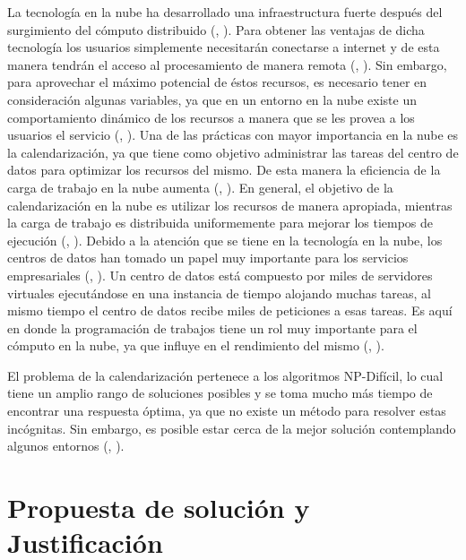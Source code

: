 La tecnolog\'ia en la nube ha desarrollado una infraestructura fuerte despu\'es del surgimiento del c\'omputo distribuido (\citeauthor{chen2009cloud}, \citeyear{chen2009cloud}). Para obtener las ventajas de dicha tecnolog\'ia los usuarios simplemente necesitar\'an conectarse a internet y de esta manera tendr\'an el acceso al procesamiento de manera remota (\citeauthor{aranganathan2011aco}, \citeyear{aranganathan2011aco}). Sin embargo, para aprovechar el m\'aximo potencial de \'estos recursos, es necesario tener en consideraci\'on algunas variables, ya que en un entorno en la nube existe un comportamiento din\'amico de los recursos a manera que se les provea a los usuarios el servicio (\citeauthor{shimpy2014different}, \citeyear{shimpy2014different}).
Una de las pr\'acticas con mayor importancia en la nube es la calendarizaci\'on, ya que tiene como objetivo administrar las tareas del centro de datos para optimizar los recursos del mismo. De esta manera la eficiencia de la carga de trabajo en la nube aumenta (\citeauthor{shimpy2014different}, \citeyear{shimpy2014different}).
En general, el objetivo de la calendarizaci\'on en la nube es utilizar los recursos de manera apropiada, mientras la carga de trabajo es distribuida uniformemente para mejorar los tiempos de ejecuci\'on (\citeauthor{shimpy2014different}, \citeyear{shimpy2014different}).
Debido a la atenci\'on que se tiene en la tecnolog\'ia en la nube, los centros de datos han tomado un papel muy importante para los servicios empresariales (\citeauthor{shimpy2014different}, \citeyear{shimpy2014different}). 
Un centro de datos est\'a compuesto por miles de servidores virtuales ejecut\'andose en una instancia de tiempo alojando muchas tareas, al mismo tiempo el centro de datos recibe miles de peticiones a esas tareas. Es aqu\'i en donde la programaci\'on de trabajos tiene un rol muy importante para el c\'omputo en la nube, ya que influye en el rendimiento del mismo (\citeauthor{srinivasan2014cloud}, \citeyear{srinivasan2014cloud}). 

El problema de la calendarizaci\'on pertenece a los algoritmos NP-Dif\'icil, lo cual tiene un amplio rango de soluciones posibles y se toma mucho m\'as tiempo de encontrar una respuesta \'optima, ya que no existe un m\'etodo para resolver estas inc\'ognitas. Sin embargo, es posible estar cerca de la mejor soluci\'on contemplando algunos entornos (\citeauthor{shimpy2014different}, \citeyear{shimpy2014different}).




\section*{Propuesta de soluci\'on y Justificaci\'on}


